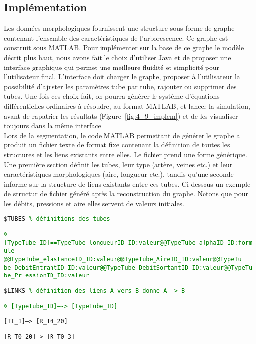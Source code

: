 \subsection{Implémentation}
Les données morphologiques fournissent une structure sous forme de graphe contenant
l’ensemble des caractéristiques de l’arborescence. Ce graphe est construit sous MATLAB. Pour
implémenter sur la base de ce graphe le modèle décrit plus haut, nous avons fait le choix d’utiliser Java
et de proposer une interface graphique qui permet une meilleure fluidité et simplicité pour l’utilisateur
final. L’interface doit charger le graphe, proposer à l’utilisateur la possibilité d’ajuster les paramètres
tube par tube, rajouter ou supprimer des tubes. Une fois ces choix fait, on pourra générer le système
d’équations différentielles ordinaires à résoudre, au format MATLAB, et lancer la simulation, avant de
rapatrier les résultats (Figure~\ref{fig:4_9_implem}) et de les visualiser toujours dans la même interface.\\

Lors de la segmentation, le code MATLAB permettant de générer le graphe a produit un fichier texte
de format fixe contenant la définition de toutes les structures et les liens existants entre elles. Le fichier
prend une forme générique. Une première section définit les tubes, leur type (artère, veines etc.) et
leur caractéristiques morphologiques (aire, longueur etc.), tandis qu’une seconde informe sur la
structure de liens existants entre ces tubes. Ci-dessous un exemple de structur de fichier généré après la reconstruction du graphe. Notons que pour les débits, pressions et aire elles
servent de valeurs initiales.

\vspace{0.4cm}
{\tt \$TUBES \textcolor{green}{\% définitions des tubes}}

{\tt \textcolor{green}{\% [TypeTube\_ID]==TypeTube\_longueurID\_ID:valeur@@TypeTube\_alphaID\_ID:formule
@@TypeTube\_elastanceID\_ID:valeur@@TypeTube\_AireID\_ID:valeur@@TypeTu
be\_DebitEntrantID\_ID:valeur@@TypeTube\_DebitSortantID\_ID:valeur@@TypeTube\_Pr
essionID\_ID:valeur}}

{\tt \$LINKS \textcolor{green}{\% définition des liens A vers B donne A --> B}}

{\tt \textcolor{green}{\% [TypeTube\_ID]—-> [TypeTube\_ID]}}

{\tt [TI\_1]--> [R\_T0\_20]}

{\tt [R\_T0\_20]--> [R\_T0\_3]}

